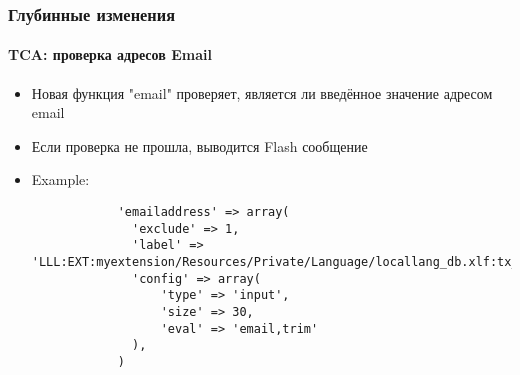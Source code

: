 \begin{frame}[fragile]
	\frametitle{Глубинные изменения}
	\framesubtitle{TCA: проверка адресов Email}

	\lstset{
		basicstyle=\tiny\ttfamily
	}

	\begin{itemize}

		\item Новая функция "email" проверяет, является ли введённое значение адресом email
		\item Если проверка не прошла, выводится Flash сообщение
		\item Example:

		\begin{lstlisting}
			'emailaddress' => array(
			  'exclude' => 1,
			  'label' => 'LLL:EXT:myextension/Resources/Private/Language/locallang_db.xlf:tx_myextension
		 	  'config' => array(
			      'type' => 'input',
			      'size' => 30,
			      'eval' => 'email,trim'
			  ),
			)
		\end{lstlisting}

	\end{itemize}

\end{frame}


